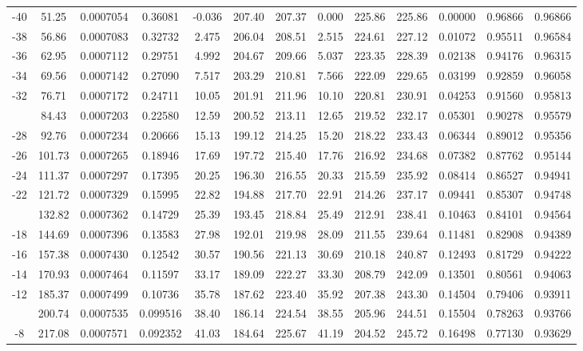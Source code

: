 \documentclass[12pt,a3paper]{article}
\begin{document}
\begin{enumerate}
\begin{center}
\begin{longtable}{c c c c c c c c c c c c c}
-40 & 51.25 & 0.0007054 & 0.36081 & -0.036 & 207.40 & 207.37 & 0.000 & 225.86 & 225.86 & 0.00000 & 0.96866 & 0.96866 \\
-38 & 56.86 & 0.0007083 & 0.32732 & 2.475 & 206.04 & 208.51 & 2.515 & 224.61 & 227.12 & 0.01072 & 0.95511 & 0.96584 \\
-36 & 62.95 & 0.0007112 & 0.29751 & 4.992 & 204.67 & 209.66 & 5.037 & 223.35 & 228.39 & 0.02138 & 0.94176 & 0.96315 \\
-34 & 69.56 & 0.0007142 & 0.27090 & 7.517 & 203.29 & 210.81 & 7.566 & 222.09 & 229.65 & 0.03199 & 0.92859 & 0.96058 \\
-32 & 76.71 & 0.0007172 & 0.24711 & 10.05 & 201.91 & 211.96 & 10.10 & 220.81 & 230.91 & 0.04253 & 0.91560 & 0.95813 \\
\addlinespace
-30 & 84.43 & 0.0007203 & 0.22580 & 12.59 & 200.52 & 213.11 & 12.65 & 219.52 & 232.17 & 0.05301 & 0.90278 & 0.95579 \\
-28 & 92.76 & 0.0007234 & 0.20666 & 15.13 & 199.12 & 214.25 & 15.20 & 218.22 & 233.43 & 0.06344 & 0.89012 & 0.95356 \\
-26 & 101.73 & 0.0007265 & 0.18946 & 17.69 & 197.72 & 215.40 & 17.76 & 216.92 & 234.68 & 0.07382 & 0.87762 & 0.95144 \\
-24 & 111.37 & 0.0007297 & 0.17395 & 20.25 & 196.30 & 216.55 & 20.33 & 215.59 & 235.92 & 0.08414 & 0.86527 & 0.94941 \\
-22 & 121.72 & 0.0007329 & 0.15995 & 22.82 & 194.88 & 217.70 & 22.91 & 214.26 & 237.17 & 0.09441 & 0.85307 & 0.94748 \\
\addlinespace
-20 & 132.82 & 0.0007362 & 0.14729 & 25.39 & 193.45 & 218.84 & 25.49 & 212.91 & 238.41 & 0.10463 & 0.84101 & 0.94564 \\
-18 & 144.69 & 0.0007396 & 0.13583 & 27.98 & 192.01 & 219.98 & 28.09 & 211.55 & 239.64 & 0.11481 & 0.82908 & 0.94389 \\
-16 & 157.38 & 0.0007430 & 0.12542 & 30.57 & 190.56 & 221.13 & 30.69 & 210.18 & 240.87 & 0.12493 & 0.81729 & 0.94222 \\
-14 & 170.93 & 0.0007464 & 0.11597 & 33.17 & 189.09 & 222.27 & 33.30 & 208.79 & 242.09 & 0.13501 & 0.80561 & 0.94063 \\
-12 & 185.37 & 0.0007499 & 0.10736 & 35.78 & 187.62 & 223.40 & 35.92 & 207.38 & 243.30 & 0.14504 & 0.79406 & 0.93911 \\
\addlinespace
-10 & 200.74 & 0.0007535 & 0.099516 & 38.40 & 186.14 & 224.54 & 38.55 & 205.96 & 244.51 & 0.15504 & 0.78263 & 0.93766 \\
-8 & 217.08 & 0.0007571 & 0.092352 & 41.03 & 184.64 & 225.67 & 41.19 & 204.52 & 245.72 & 0.16498 & 0.77130 & 0.93629 \\

\end{longtable}
\end{center}
\end{enumerate}
\end{document}
